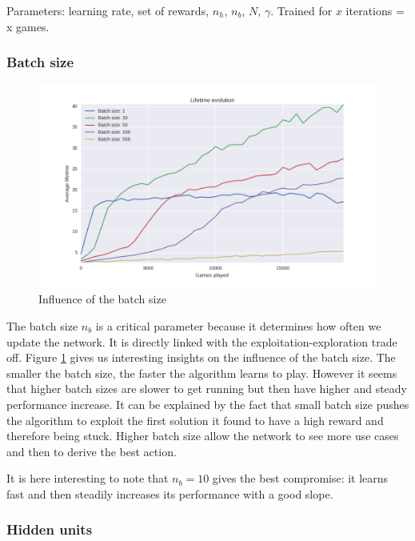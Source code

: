\documentclass{article}
\begin{document}
Parameters: learning rate, set of rewards, $n_h$, $n_b$, $N$, $\gamma$. Trained for $x$ iterations = x games.

\subsubsection*{Batch size}

\begin{figure}[!htpb]
\centering
  \includegraphics[width=.8\linewidth]{batch_size_dependence.png}
  \caption{Influence of the batch size}
  \label{batch_size}
\end{figure}

The batch size $n_b$ is a critical parameter because it determines how often we update the network.
It is directly linked with the exploitation-exploration trade off.
Figure \ref{batch_size} gives us interesting insights on the influence of the batch size.
The smaller the batch size, the faster the algorithm learns to play. However it seems that higher batch sizes are slower to get running but then have higher and steady performance increase.
It can be explained by the fact that small batch size pushes the algorithm to exploit the first solution it found to have a high reward and therefore being stuck. Higher batch size allow the network to see more use cases and then to derive the best action.

It is here interesting to note that $n_b = 10$ gives the best compromise: it learns fast and then steadily increases its performance with a good slope.

\subsubsection*{Hidden units}
\end{document}

